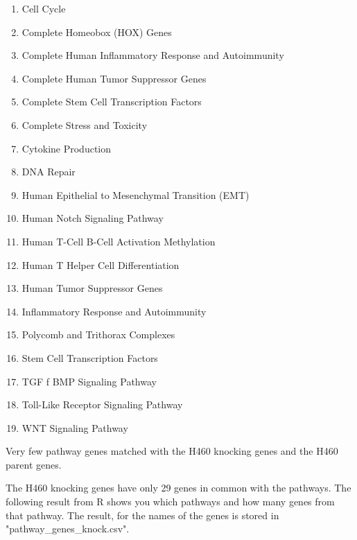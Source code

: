 \documentclass[11pt]{article}
\begin{document}
\begin{enumerate}
\item Cell Cycle                                 
\item Complete Homeobox (HOX) Genes                      
\item Complete Human Inflammatory Response and Autoimmunity 
\item Complete Human Tumor Suppressor Genes              
\item Complete Stem Cell Transcription Factors            
\item Complete Stress and Toxicity                         
\item Cytokine Production                                
\item DNA Repair 
\item Human Epithelial to Mesenchymal Transition (EMT)    
\item Human Notch Signaling Pathway                      
\item Human T-Cell B-Cell Activation Methylation         
\item Human T Helper Cell Differentiation                
\item Human Tumor Suppressor Genes                        
\item Inflammatory Response and Autoimmunity               
\item Polycomb and Trithorax Complexes                     
\item Stem Cell Transcription Factors                    
\item TGF f BMP Signaling Pathway                          
\item Toll-Like Receptor Signaling Pathway               
\item WNT Signaling Pathway                              
\end{enumerate}


Very few pathway genes matched with the H460 knocking genes and the H460 parent genes. 

The H460 knocking genes have only 29 genes in common with the pathways. The following result from R shows you which pathways and how many genes from that pathway. The result, for the names of the genes is stored in "pathway\_genes\_knock.csv". 

\vspace{0.5in}
\end{document}
